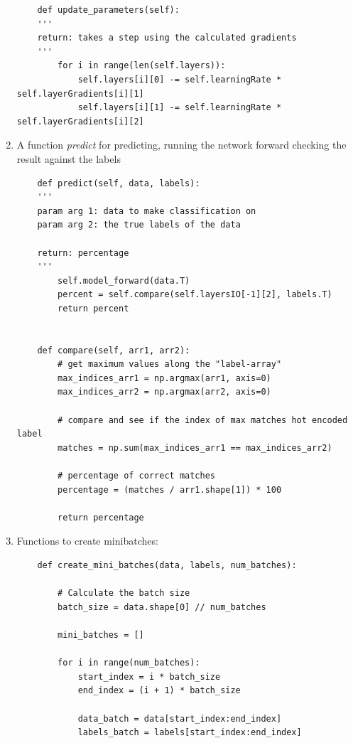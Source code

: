 \documentclass[a4paper,10pt]{article}
\begin{document}
\begin{enumerate}
\begin{lstlisting}
    def update_parameters(self):
    '''
    return: takes a step using the calculated gradients
    '''
        for i in range(len(self.layers)):
            self.layers[i][0] -= self.learningRate * self.layerGradients[i][1]
            self.layers[i][1] -= self.learningRate * self.layerGradients[i][2]
\end{lstlisting}

    \item A function \emph{predict} for predicting, running the network forward checking the result against the labels

\begin{lstlisting}
    def predict(self, data, labels):
    '''
    param arg 1: data to make classification on
    param arg 2: the true labels of the data

    return: percentage 
    '''
        self.model_forward(data.T)
        percent = self.compare(self.layersIO[-1][2], labels.T)
        return percent


    def compare(self, arr1, arr2):
        # get maximum values along the "label-array" 
        max_indices_arr1 = np.argmax(arr1, axis=0)
        max_indices_arr2 = np.argmax(arr2, axis=0)

        # compare and see if the index of max matches hot encoded label
        matches = np.sum(max_indices_arr1 == max_indices_arr2)

        # percentage of correct matches
        percentage = (matches / arr1.shape[1]) * 100

        return percentage
\end{lstlisting}

\newpage

    \item Functions to create minibatches: 

\begin{lstlisting}
    def create_mini_batches(data, labels, num_batches):

        # Calculate the batch size
        batch_size = data.shape[0] // num_batches

        mini_batches = []

        for i in range(num_batches):
            start_index = i * batch_size
            end_index = (i + 1) * batch_size

            data_batch = data[start_index:end_index]
            labels_batch = labels[start_index:end_index]


\end{lstlisting}
\end{enumerate}
\end{document}
